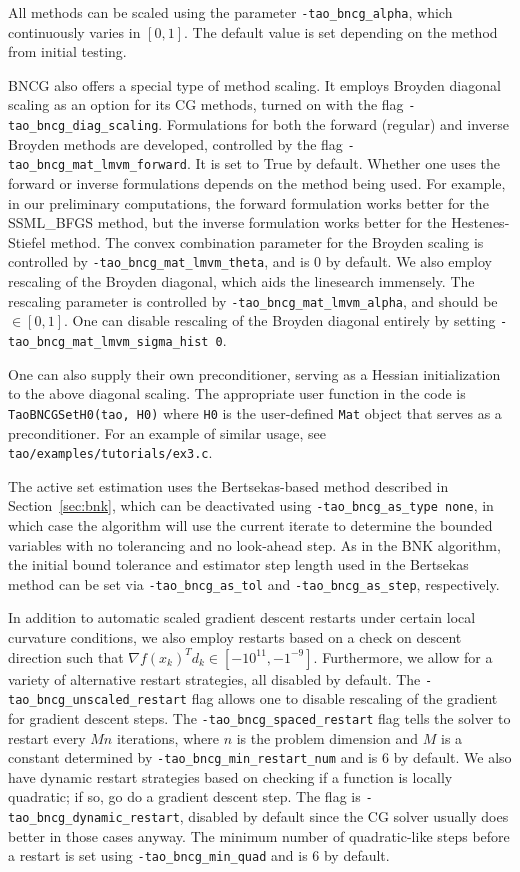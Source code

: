 All methods can be scaled using the parameter {\tt -tao\_bncg\_alpha}, which continuously
 varies in $[0, 1]$. The default value is set depending on the method from initial testing.

BNCG also offers a special type of method scaling. It employs Broyden diagonal scaling
as an option for its CG methods, turned on with the flag {\tt -tao\_bncg\_diag\_scaling}. Formulations for both the forward (regular) and inverse Broyden methods are developed,
 controlled by the flag {\tt -tao\_bncg\_mat\_lmvm\_forward}. It is set to True 
by default. Whether one uses the forward
or inverse formulations depends on the method being used. For example, in our preliminary computations,
the forward formulation works better for the SSML\_BFGS method, but the inverse formulation
works better for the Hestenes-Stiefel method. The convex combination parameter for the
 Broyden scaling is controlled by {\tt -tao\_bncg\_mat\_lmvm\_theta}, and is 0 by default. We also
employ rescaling of the Broyden diagonal, which aids the linesearch immensely. 
The rescaling parameter is controlled by {\tt -tao\_bncg\_mat\_lmvm\_alpha}, 
and should be $\in [0, 1]$. One can disable rescaling of the Broyden diagonal entirely by
 setting {\tt -tao\_bncg\_mat\_lmvm\_sigma\_hist 0}.

One can also supply their own preconditioner, serving as a Hessian initialization to
 the above diagonal scaling.
The appropriate user function in the code is {\tt TaoBNCGSetH0(tao, H0)} where 
{\tt H0} is the user-defined {\tt Mat} object that serves as a preconditioner. 
For an example of similar usage, see {\tt tao/examples/tutorials/ex3.c}.

The active set estimation uses the Bertsekas-based method described in Section~\ref{sec:bnk},
which can be deactivated using {\tt -tao\_bncg\_as\_type none}, in which case the 
algorithm will use the current iterate to determine the bounded variables with no tolerancing 
and no look-ahead step. As in the BNK algorithm, the initial bound tolerance and estimator
step length used in the Bertsekas method can be set via {\tt -tao\_bncg\_as\_tol} and 
{\tt -tao\_bncg\_as\_step}, respectively.

In addition to automatic scaled gradient descent restarts under certain local curvature conditions,
we also employ restarts based on a check on descent direction 
such that $\nabla f(x_k)^T d_k \in [-10^{11}, -1^{-9}]$.
Furthermore, we allow for a variety of alternative restart strategies, 
all disabled by default.
The {\tt -tao\_bncg\_unscaled\_restart} flag allows one to 
disable rescaling of the gradient for
gradient descent steps. The {\tt -tao\_bncg\_spaced\_restart} flag tells the 
solver to restart every $Mn$ iterations,
where $n$ is the problem dimension and $M$ is a constant 
determined by {\tt -tao\_bncg\_min\_restart\_num} and is
6 by default. We also have dynamic restart strategies based on 
checking if a function is locally quadratic; if so,
go do a gradient descent step. The flag is {\tt -tao\_bncg\_dynamic\_restart}, 
disabled by default since the CG
solver usually does better in those cases anyway. 
The minimum number of quadratic-like steps before a restart is 
set using {\tt -tao\_bncg\_min\_quad} and is 6 by default. 


